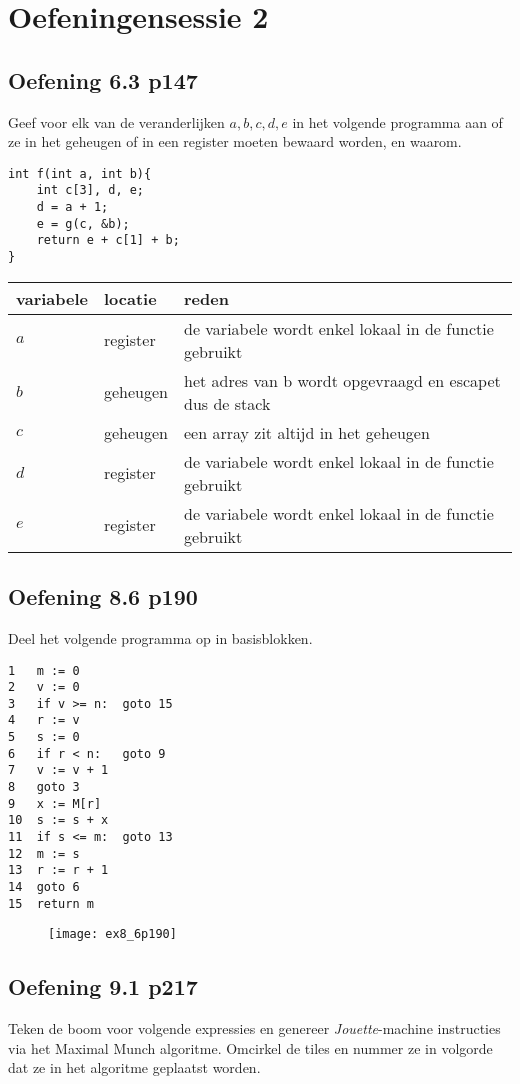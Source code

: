 \chapter{Oefeningensessie 2}

\section{Oefening 6.3 p147}
Geef voor elk van de veranderlijken $a, b, c, d, e$ in het volgende programma aan of ze in het geheugen of in een register moeten bewaard worden, en waarom.
\begin{lstlisting}
int f(int a, int b){
	int c[3], d, e;
	d = a + 1;
	e = g(c, &b);
	return e + c[1] + b;
}
\end{lstlisting}
\begin{table}[ht]
	\centering
	\begin{tabular}{l | l | l}
		variabele & locatie & reden \\
		\hline
		$a$ & register & de variabele wordt enkel lokaal in de functie gebruikt\\
		$b$ & geheugen & het adres van b wordt opgevraagd en escapet dus de stack\\
		$c$ & geheugen & een array zit altijd in het geheugen\\
		$d$ & register & de variabele wordt enkel lokaal in de functie gebruikt\\
		$e$ & register & de variabele wordt enkel lokaal in de functie gebruikt\\
	\end{tabular}
\end{table}
\section{Oefening 8.6 p190}
Deel het volgende programma op in basisblokken.
\begin{lstlisting}
1	m := 0
2	v := 0
3	if v >= n: 	goto 15
4	r := v
5 	s := 0
6	if r < n: 	goto 9
7	v := v + 1
8	goto 3
9	x := M[r]
10	s := s + x
11	if s <= m:	goto 13
12	m := s
13	r := r + 1
14 	goto 6
15 	return m
\end{lstlisting}


\begin{figure}[ht]
	\texttt{[image: ex8\_6p190]}
\end{figure}

\section{Oefening 9.1 p217}
Teken de boom voor volgende expressies en genereer \textit{Jouette}-machine instructies via het Maximal Munch algoritme. Omcirkel de tiles en nummer ze in volgorde dat ze in het algoritme geplaatst worden. 

